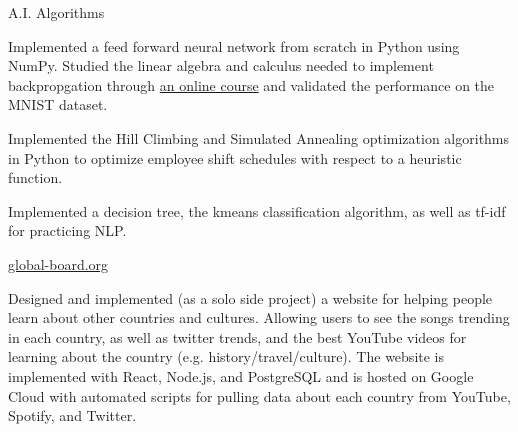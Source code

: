 
\begin{cventries}
  \cventry
    {} %
    {A.I. Algorithms} %
    {} %
    {} %
    {
      \begin{cvitems} %
      \item {Implemented a feed forward neural network from scratch in Python using NumPy.  Studied the linear algebra and calculus needed to implement backpropgation through \href{http://neuralnetworksanddeeplearning.com/}{an online course} and validated the performance on the MNIST dataset.}
      \item {Implemented the Hill Climbing and Simulated Annealing optimization algorithms in Python 
to optimize employee shift schedules with respect to a heuristic function.}
      \item {Implemented a decision tree, the kmeans classification algorithm, as well as tf-idf for practicing NLP.}
      \end{cvitems}
    }

  \cventry
    {} %
    {\href{https://global-board.org}{global-board.org}} %
    {} %
    {} %
    {
      \begin{cvitems} %
      \item {Designed and implemented (as a solo side project) a website for helping people learn about other countries and cultures.  Allowing users to see the songs trending in each country, as well as twitter trends, and the best YouTube videos for learning about the country (e.g. history/travel/culture).  The website is implemented with React, Node.js, and PostgreSQL and is hosted on Google Cloud with automated scripts for pulling data about each country from YouTube, Spotify, and Twitter.}
      \end{cvitems}
    }
\end{cventries}
